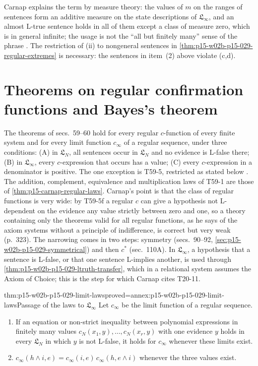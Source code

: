Carnap explains the term by measure theory: the values of \(m\) on the
ranges of sentences form an additive measure on the state descriptions
of \(\mathfrak L_\infty\), and an almost L-true sentence holds in all
of them except a class of measure zero, which is in general infinite;
the usage is not the ``all but finitely many'' sense of the phrase
\cite[sec.~58, p.~313]{Carnap1950Probability}. The restriction of
(ii) to nongeneral sentences in \cref{thm:p15-w02b-p15-029-regular-extremes}
is necessary: the sentences in item~(2) above violate (c,d).

\section{Theorems on regular confirmation functions and Bayes's theorem}
\label{sec:p15-w02b-p15-029-bayes}

The theorems of secs.~59--60 hold for every regular \(c\)-function of
every finite system and for every limit function \(c_\infty\) of a
regular sequence, under three conditions: (A) in \(\mathfrak L_N\), all
sentences occur in \(\mathfrak L_N\) and no evidence is L-false there;
(B) in \(\mathfrak L_\infty\), every \(c\)-expression that occurs has
a value; (C) every \(c\)-expression in a denominator is positive. The
one exception is T59-5, restricted as stated below
\cite[sec.~59, pp.~315--316]{Carnap1950Probability}. The addition,
complement, equivalence and multiplication laws of T59-1 are those of
\cref{thm:p15-carnap-regular-laws}. Carnap's point is that the class of
regular functions is very wide: by T59-5f a regular \(c\) can give a
hypothesis not L-dependent on the evidence any value strictly between
zero and one, so a theory containing only the theorems valid for all
regular functions, as he says of the axiom systems without a principle
of indifference, is correct but very weak (p.~323). The narrowing comes
in two steps: symmetry (secs.~90--92,
\cref{sec:p15-w02b-p15-029-symmetrical}) and then \(c^*\) (sec.~110A).
In \(\mathfrak L_\infty\), a hypothesis that a sentence is L-false,
or that one sentence L-implies another, is used through
\cref{thm:p15-w02b-p15-029-ltruth-transfer}, which in a relational
system assumes the Axiom of Choice; this is the step for which Carnap
cites T20-11.

\begin{hblemma}{thm:p15-w02b-p15-029-limit-laws}{proved=annex:p15-w02b-p15-029-limit-laws}{Passage of the laws to \(\mathfrak L_\infty\)}
Let \(c_\infty\) be the limit function of a regular sequence.
\begin{enumerate}
 \item If an equation or non-strict inequality between polynomial
       expressions in finitely many values
       \(c_N(x_1,y),\ldots,c_N(x_r,y)\) with one evidence \(y\) holds in every \(\mathfrak L_N\) in which \(y\) is not
       L-false, it holds for \(c_\infty\) whenever these limits exist.
 \item \(c_\infty(h\land i,e)=c_\infty(i,e)\,c_\infty(h,e\land i)\)
       whenever the three values exist.
\end{enumerate}
\end{hblemma}

